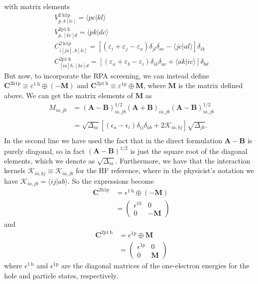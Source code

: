 with matrix elements
$$
\begin{gathered}
V_{p, k[l c]}^{2 \mathrm{~h} 1 \mathrm{p}}=\langle p c | k l\rangle \\
V_{p,[k c] d}^{2 \mathrm{p} 1 \mathrm{~h}}=\langle p k | d c\rangle \\
C_{i[j a], k[l c]}^{2 \mathrm{~h} 1 \mathrm{p}}=\left[\left(\varepsilon_i+\varepsilon_j-\varepsilon_a\right) \delta_{j l} \delta_{a c}-\langle j c | a l\rangle\right] \delta_{i k} \\
C_{[i a] b,[k c] d}^{2 \mathrm{p} 1 \mathrm{~h}}=\left[\left(\varepsilon_a+\varepsilon_b-\varepsilon_i\right) \delta_{i k} \delta_{a c}+\langle a k | i c\rangle\right] \delta_{b d}
\end{gathered}
$$
But now, to incorporate the RPA screening, we can instead define $\bm{C}^{2 \text{h1p}} \equiv \varepsilon^{1 \mathrm{~h}} \oplus(-\bm{M})$ and $\bm{C}^{2 \mathrm{p} 1 \mathrm{~h}} \equiv \varepsilon^{1 \mathrm{p}} \oplus \bm{M}$, where $\bm{M}$ is the matrix defined above. We can get the matrix elements of $\bm{M}$ as
\begin{align}
    M_{i a, j b} &= \left(\bm{A}-\bm{B}\right)^{1 / 2}_{i a, j b} \left(\bm{A}+\bm{B}\right)_{i a, j b} \left(\bm{A}-\bm{B}\right)^{1 / 2}_{i a, j b} \\
\\
&= \sqrt{\Delta _{ia}}\left[\left(\epsilon_a-\epsilon_i\right) \delta_{i j} \delta_{a b}+2 \mathcal{K}_{i a, b j}
\right] \sqrt{\Delta _{jb}}. \\
\end{align}
In the second line we have used the fact that in the direct formulation $\bm{A}-\bm{B}$ is purely diagonal, so in fact $\left(\bm{A}-\bm{B}\right)^{1/2}$ is just the square root of the diagonal elements, which we denote as $\sqrt{\Delta_{ia}}$. Furthermore, we have that the interaction kernels $\mathcal{K}_{ia,bj} \equiv \mathcal{K}_{i a, j b}$ for the HF reference, where in the physicist's notation we have $\mathcal{K}_{i a, j b} = \langle i j | a b \rangle$. So the expressions become
\begin{align}
    \bm{C}^{2 \text{h1p}} &= \epsilon^{1 \mathrm{~h}} \oplus (-\bm{M}) \\
& = \begin{pmatrix}
    \epsilon ^{1h} & 0 \\
    0 & -\bm{M}
\end{pmatrix}
\end{align}
and
\begin{align}
    \bm{C}^{2 \mathrm{p} 1 \mathrm{~h}} &= \epsilon^{1 \mathrm{p}} \oplus \bm{M} \\
& = \begin{pmatrix}
    \epsilon ^{1p} & 0 \\
    0 & \bm{M}
\end{pmatrix}
\end{align}
where $\epsilon^{1 \mathrm{~h}}$ and $\epsilon^{1 \mathrm{p}}$ are the diagonal matrices of the one-electron energies for the hole and particle states, respectively. 

